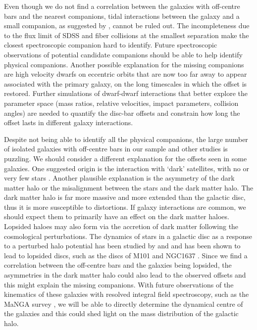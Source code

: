 \documentclass[a4paper,fleqn,usenatbib,useAMS]{mnras}
\begin{document}
Even though we do not find a correlation between the galaxies with off-centre bars and the nearest companions, tidal interactions between the galaxy and a small companion, as suggested by \citet{Pardy2016}, cannot be ruled out. The incompleteness due to the flux limit of SDSS and fiber collisions at the smallest separation make the closest spectroscopic companion hard to identify. Future spectroscopic observations of potential candidate companions should be able to help identify physical companions. Another possible explanation for the missing companions are high velocity dwarfs on eccentric orbits that are now too far away to appear associated with the primary galaxy, on the long timescales in which the offset is restored. Further simulations of dwarf-dwarf interactions that better explore the parameter space (mass ratios, relative velocities, impact parameters, collision angles) are needed to quantify the disc-bar offsets and constrain how long the offset lasts in different galaxy interactions.

Despite not being able to identify all the physical companions, the large number of isolated galaxies with off-centre bars in our sample and other studies \citep{Feitzinger1980, Wilcots2004} is puzzling. We should consider a different explanation for the offsets seen in some galaxies. One suggested origin is the interaction with `dark' satellites, with no or very few stars \citep{Bekki2009}. Another plausible explanation is the asymmetry of the dark matter halo \citep{levine1998} or the misalignment between the stars and the dark matter halo. The dark matter halo is far more massive and more extended than the galactic disc, thus it is more susceptible to distortions. If galaxy interactions are common, we should expect them to primarily have an effect on the dark matter haloes. Lopsided haloes may also form via the accretion of dark matter following the cosmological perturbations. The dynamics of stars in a galactic disc as a response to a perturbed halo potential has been studied by \citet{Jog1997} and \citet{Jog1999} and has been shown to lead to lopsided discs, such as the discs of M101 and NGC1637 \citep{Sandage1961}. Since we find a correlation between the off-centre bars and the galaxies being lopsided, the asymmetries in the dark matter halo could also lead to the observed offsets and this might explain the missing companions. With future observations of the kinematics of these galaxies with resolved integral field spectroscopy, such as the MaNGA survey \citep{Manga2016}, we will be able to directly determine the dynamical centre of the galaxies and this could shed light on the mass distribution of the galactic halo. 
\end{document}
